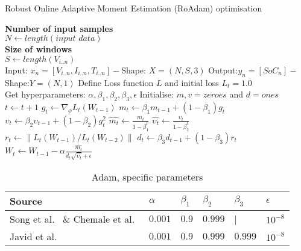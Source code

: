 \begin{algorithm}
  \caption{Robust Online Adaptive Moment Estimation (RoAdam) optimisation}
  \begin{algorithmic}[1]
    \STATE \textbf{Number of input samples} \\ $N\gets length(\textit{input data})$\\
    \STATE \textbf{Size of windows} \\ $S\gets length(V_{i..n})$\\
    \STATE Input: $x_n = [V_{i..n}, I_{i..n}, T_{i..n}] - $Shape: $X = (N, S, 3)$
    \STATE Output:$y_n = [SoC_{n}] - $Shape:$Y = (N, 1)$
    \STATE Define Loss function $L$ and initial loss $L_t = 1.0$ \\
           Get hyperparameters: $\alpha, \beta_1, \beta_2, \beta_3, \epsilon$
    \STATE Initialise: $m,v=zeroes$ and $d=ones$ \\
    \STATE $t \gets t+1$
    \STATE $g_t \gets \nabla_\phi L_t (W_{t-1})$ 
    \STATE $m_t \gets \beta_1 m_{t-1}+(1-\beta_1) g_t $ 
    \STATE $\upsilon_t \gets \beta_2 \upsilon_{t-1}+ \left(1-\beta_2 \right)g^2_t $ 
    \STATE $\hat{m_t} \gets \frac{m_t}{1-\beta^t_1}$ 
    \STATE $\hat{\upsilon_t} \gets \frac{\upsilon_t}{1-\beta^t_2} $ 
    \STATE $r_t \gets \parallel L_t\left(W_{t-1}\right)/L_t\left(W_{t-2}\right) \parallel $ 
    \STATE $d_t \gets \beta_3 d_{t-1}+\left(1-\beta_3\right)r_t $ 
    \STATE $W_t \gets W_{t-1}- \alpha \frac{\hat{m_t}}{d_t\sqrt{\hat{\upsilon_t}}+\epsilon} $ 
    \ENDWHILE
  \end{algorithmic}
  \label{alg:RoAdam}
\end{algorithm}
\begin{table}[htbp]
    \centering
    \caption{Adam, specific parameters}
    \label{tab:adam-params}
    \begin{tabular}{ p{6.0cm} p{1.5cm} p{1.5cm} p{1.5cm} p{1.5cm} p{1.5cm}  }
        \hline
        Source     & $\alpha$ & $\beta_1 $ & $\beta_2$ & $\beta_3$ &  $\epsilon$ \\
        \hline
        Song et al.~\cite{song_lithium-ion_2018} \& Chemale et al.~\cite{Chemali2017}
                & $0.001$ & $0.9$ & $0.999$ & |   &$10^{-8}$ \\%
        Javid et al.~\cite{javid_adaptive_2020}
                & $0.001$ & $0.9$ & $0.999$ & $0.999$ &$10^{-8}$ \\%
        \hline
    \end{tabular}
\end{table}


